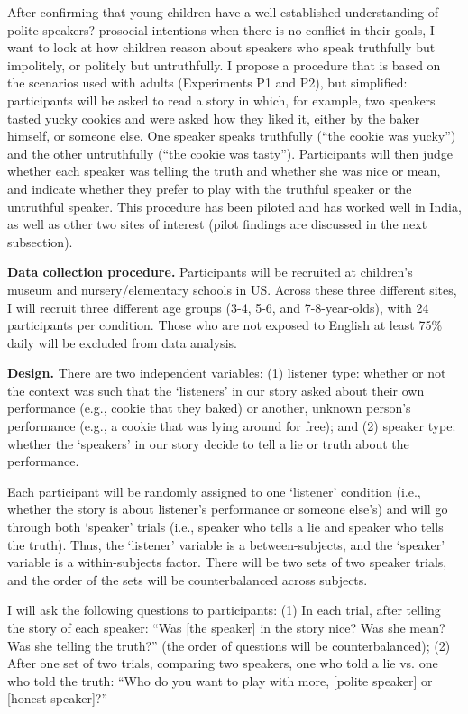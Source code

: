 After confirming that young children have a well-established understanding of polite speakers? prosocial intentions when there is no conflict in their goals, I want to look at how children reason about speakers who speak truthfully but impolitely, or politely but untruthfully. I propose a procedure that is based on the scenarios used with adults (Experiments P1 and P2), but simplified: participants will be asked to read a story in which, for example, two speakers tasted yucky cookies and were asked how they liked it, either by the baker himself, or someone else. One speaker speaks truthfully (``the cookie was yucky'') and the other untruthfully (``the cookie was tasty''). Participants will then judge whether each speaker was telling the truth and whether she was nice or mean, and indicate whether they prefer to play with the truthful speaker or the untruthful speaker. This procedure has been piloted and has worked well in India, as well as other two sites of interest (pilot findings are discussed in the next subsection).
 
{\bf Data collection procedure.} Participants will be recruited at children's museum and nursery/elementary schools in US. Across these three different sites, I will recruit three different age groups (3-4, 5-6, and 7-8-year-olds), with 24 participants per condition. Those who are not exposed to English at least 75\% daily will be excluded from data analysis. 

{\bf Design.} There are two independent variables: (1) listener type: whether or not the context was such that the `listeners' in our story asked about their own performance (e.g., cookie that they baked) or another, unknown person's performance (e.g., a cookie that was lying around for free); and (2) speaker type: whether the `speakers' in our story decide to tell a lie or truth about the performance. 

Each participant will be randomly assigned to one `listener' condition (i.e., whether the story is about listener's performance or someone else's) and will go through both `speaker' trials (i.e., speaker who tells a lie and speaker who tells the truth). Thus, the `listener' variable is a between-subjects, and the `speaker' variable is a within-subjects factor. There will be two sets of two speaker trials, and the order of the sets will be counterbalanced across subjects.

I will ask the following questions to participants: (1) In each trial, after telling the story of each speaker: ``Was [the speaker] in the story nice? Was she mean? Was she telling the truth?'' (the order of questions will be counterbalanced); (2) After one set of two trials, comparing two speakers, one who told a lie vs. one who told the truth: ``Who do you want to play with more, [polite speaker] or [honest speaker]?''

